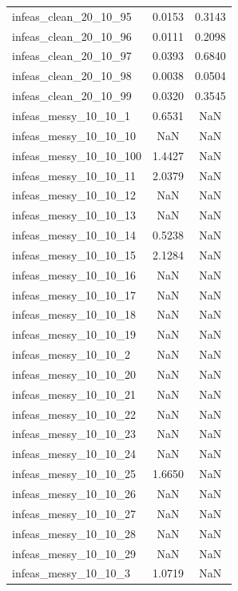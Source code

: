 \begin{longtable}{lcc}
infeas\_clean\_20\_10\_95  &   0.0153 &  0.3143 \\
infeas\_clean\_20\_10\_96  &   0.0111 &  0.2098 \\
infeas\_clean\_20\_10\_97  &   0.0393 &  0.6840 \\
infeas\_clean\_20\_10\_98  &   0.0038 &  0.0504 \\
infeas\_clean\_20\_10\_99  &   0.0320 &  0.3545 \\
infeas\_messy\_10\_10\_1   &   0.6531 &     NaN \\
infeas\_messy\_10\_10\_10  &      NaN &     NaN \\
infeas\_messy\_10\_10\_100 &   1.4427 &     NaN \\
infeas\_messy\_10\_10\_11  &   2.0379 &     NaN \\
infeas\_messy\_10\_10\_12  &      NaN &     NaN \\
infeas\_messy\_10\_10\_13  &      NaN &     NaN \\
infeas\_messy\_10\_10\_14  &   0.5238 &     NaN \\
infeas\_messy\_10\_10\_15  &   2.1284 &     NaN \\
infeas\_messy\_10\_10\_16  &      NaN &     NaN \\
infeas\_messy\_10\_10\_17  &      NaN &     NaN \\
infeas\_messy\_10\_10\_18  &      NaN &     NaN \\
infeas\_messy\_10\_10\_19  &      NaN &     NaN \\
infeas\_messy\_10\_10\_2   &      NaN &     NaN \\
infeas\_messy\_10\_10\_20  &      NaN &     NaN \\
infeas\_messy\_10\_10\_21  &      NaN &     NaN \\
infeas\_messy\_10\_10\_22  &      NaN &     NaN \\
infeas\_messy\_10\_10\_23  &      NaN &     NaN \\
infeas\_messy\_10\_10\_24  &      NaN &     NaN \\
infeas\_messy\_10\_10\_25  &   1.6650 &     NaN \\
infeas\_messy\_10\_10\_26  &      NaN &     NaN \\
infeas\_messy\_10\_10\_27  &      NaN &     NaN \\
infeas\_messy\_10\_10\_28  &      NaN &     NaN \\
infeas\_messy\_10\_10\_29  &      NaN &     NaN \\
infeas\_messy\_10\_10\_3   &   1.0719 &     NaN \\

\end{longtable}
